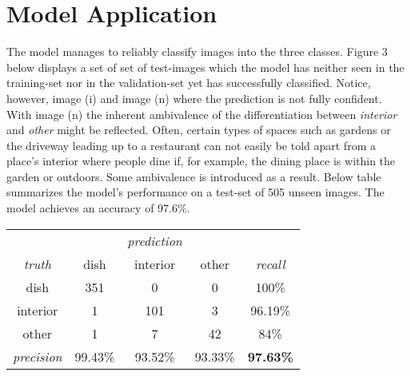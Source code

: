 \documentclass[11pt, oneside]{article}   	%
\begin{document}
\section{Model Application}
The model manages to reliably classify images into the three classes. Figure 3 below displays a set of set of test-images which the model has neither seen in the training-set nor in the validation-set yet has successfully classified. Notice, however, image (i) and image (n) where the prediction is not fully confident. With image (n) the inherent ambivalence of the differentiation between \textit{interior} and \textit{other} might be reflected. Often, certain types of spaces such as gardens or the driveway leading up to a restaurant can not easily be told apart from a place's interior where people dine if, for example, the dining place is within the garden or outdoors. Some ambivalence is introduced as a result.
\newline
\newline
Below table summarizes the model's performance on a test-set of 505 unseen images. The model achieves an accuracy of 97.6\%.

\begin{center}
\begin{tabular}{c|ccc|c}
&&\textit{prediction}&&\\
\textit{truth}&dish&interior&other&\textit{recall}\\
\hline
dish&351&0&0&100\%\\
interior&1&101&3&96.19\%\\
other&1&7&42&84\%\\
\hline
\textit{precision}&99.43\%&93.52\%&93.33\%&\textbf{97.63\%}\\

 
 
\end{tabular}
\end{center}
\end{document}
